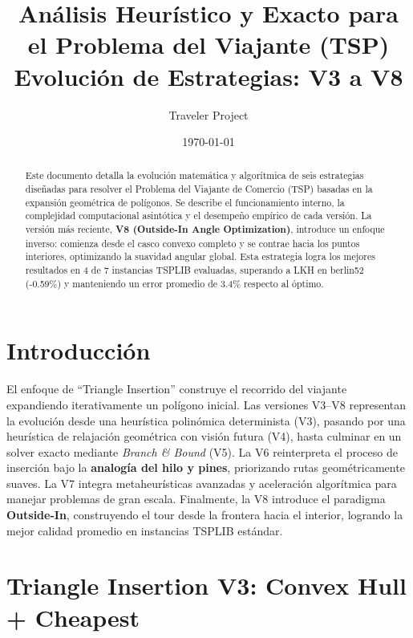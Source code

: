 \documentclass[12pt, a4paper]{article}
\title{\textbf{Análisis Heurístico y Exacto para el Problema del Viajante (TSP)}\\\large Evolución de Estrategias: V3 a V8}
\author{Traveler Project}
\date{\today}
\begin{document}
\maketitle

\begin{abstract}
Este documento detalla la evolución matemática y algorítmica de seis estrategias diseñadas para resolver el Problema del Viajante de Comercio (TSP) basadas en la expansión geométrica de polígonos. Se describe el funcionamiento interno, la complejidad computacional asintótica y el desempeño empírico de cada versión. La versión más reciente, \textbf{V8 (Outside-In Angle Optimization)}, introduce un enfoque inverso: comienza desde el casco convexo completo y se contrae hacia los puntos interiores, optimizando la suavidad angular global. Esta estrategia logra los mejores resultados en 4 de 7 instancias TSPLIB evaluadas, superando a LKH en berlin52 (-0.59\%) y manteniendo un error promedio de 3.4\% respecto al óptimo.
\end{abstract}

\section{Introducción}
El enfoque de ``Triangle Insertion'' construye el recorrido del viajante expandiendo iterativamente un polígono inicial. Las versiones V3--V8 representan la evolución desde una heurística polinómica determinista (V3), pasando por una heurística de relajación geométrica con visión futura (V4), hasta culminar en un solver exacto mediante \textit{Branch \& Bound} (V5). La V6 reinterpreta el proceso de inserción bajo la \textbf{analogía del hilo y pines}, priorizando rutas geométricamente suaves. La V7 integra metaheurísticas avanzadas y aceleración algorítmica para manejar problemas de gran escala. Finalmente, la V8 introduce el paradigma \textbf{Outside-In}, construyendo el tour desde la frontera hacia el interior, logrando la mejor calidad promedio en instancias TSPLIB estándar.

\section{Triangle Insertion V3: Convex Hull + Cheapest}
\end{document}
